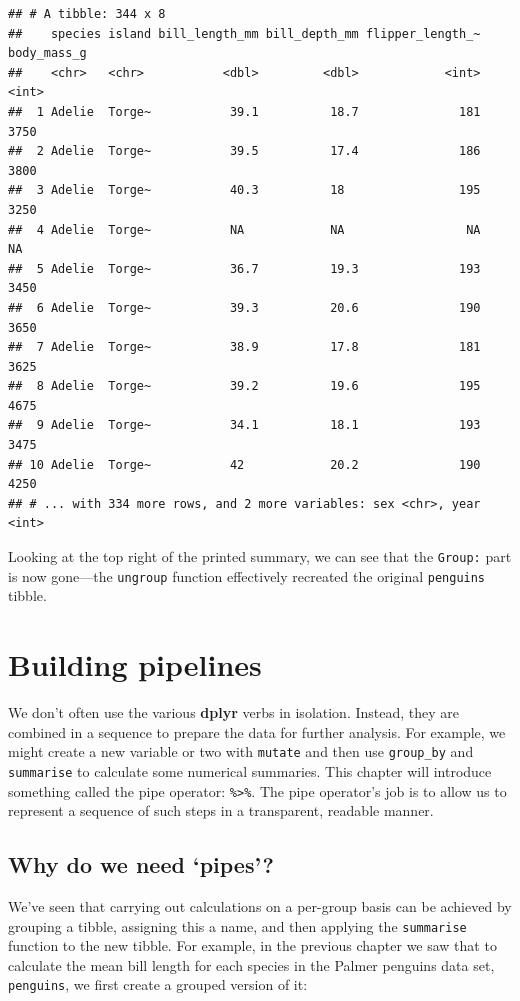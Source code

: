 \documentclass[
]{book}
\begin{document}
\begin{verbatim}
## # A tibble: 344 x 8
##    species island bill_length_mm bill_depth_mm flipper_length_~ body_mass_g
##    <chr>   <chr>           <dbl>         <dbl>            <int>       <int>
##  1 Adelie  Torge~           39.1          18.7              181        3750
##  2 Adelie  Torge~           39.5          17.4              186        3800
##  3 Adelie  Torge~           40.3          18                195        3250
##  4 Adelie  Torge~           NA            NA                 NA          NA
##  5 Adelie  Torge~           36.7          19.3              193        3450
##  6 Adelie  Torge~           39.3          20.6              190        3650
##  7 Adelie  Torge~           38.9          17.8              181        3625
##  8 Adelie  Torge~           39.2          19.6              195        4675
##  9 Adelie  Torge~           34.1          18.1              193        3475
## 10 Adelie  Torge~           42            20.2              190        4250
## # ... with 334 more rows, and 2 more variables: sex <chr>, year <int>
\end{verbatim}

Looking at the top right of the printed summary, we can see that the \texttt{Group:} part is now gone---the \texttt{ungroup} function effectively recreated the original \texttt{penguins} tibble.

\hypertarget{building-pipelines}{%
\chapter{Building pipelines}\label{building-pipelines}}

We don't often use the various \textbf{dplyr} verbs in isolation. Instead, they are combined in a sequence to prepare the data for further analysis. For example, we might create a new variable or two with \texttt{mutate} and then use \texttt{group\_by} and \texttt{summarise} to calculate some numerical summaries. This chapter will introduce something called the pipe operator: \texttt{\%\textgreater{}\%}. The pipe operator's job is to allow us to represent a sequence of such steps in a transparent, readable manner.

\hypertarget{why-do-we-need-pipes}{%
\section{Why do we need `pipes'?}\label{why-do-we-need-pipes}}

We've seen that carrying out calculations on a per-group basis can be achieved by grouping a tibble, assigning this a name, and then applying the \texttt{summarise} function to the new tibble. For example, in the previous chapter we saw that to calculate the mean bill length for each species in the Palmer penguins data set, \texttt{penguins}, we first create a grouped version of it:
\end{document}

